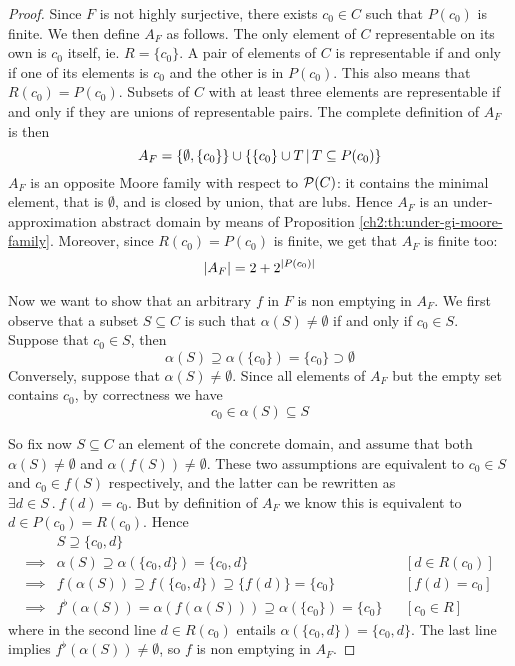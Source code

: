 \begin{proof}
	Since $F$ is not highly surjective, there exists $c_0 \in C$ such that $P(c_0)$ is finite. We then define $A_F$ as follows.
	The only element of $C$ representable on its own is $c_0$ itself, ie. $R = \{ c_0 \}$.
	A pair of elements of $C$ is representable if and only if one of its elements is $c_0$ and the other is in $P(c_0)$. This also means that $R(c_0) = P(c_0)$.
	Subsets of $C$ with at least three elements are representable if and only if they are unions of representable pairs.
	The complete definition of $A_F$ is then
	\[
	A_F = \{ \emptyset, \{ c_0 \} \} \cup \{ \{ c_0 \} \cup T \,\vert\, T \subseteq P(c_0) \}
	\]
	$A_F$ is an opposite Moore family with respect to $\mathcal{P}(C)$: it contains the minimal element, that is $\emptyset$, and is closed by union, that are lubs. Hence $A_F$ is an under-approximation abstract domain by means of Proposition \ref{ch2:th:under-gi-moore-family}.
	Moreover, since $R(c_0) = P(c_0)$ is finite, we get that $A_F$ is finite too:
	\[
	\lvert A_F\rvert = 2 + 2^{\lvert P(c_0)\rvert}
	\]

	Now we want to show that an arbitrary $f$ in $F$ is non emptying in $A_F$.
	We first observe that a subset $S \subseteq C$ is such that $\alpha(S) \neq \emptyset$ if and only if $c_0 \in S$. Suppose that $c_0 \in S$, then
	\[
	\alpha(S) \supseteq \alpha(\{ c_0 \}) = \{ c_0 \} \supset \emptyset
	\]
	Conversely, suppose that $\alpha(S) \neq \emptyset$. Since all elements of $A_F$ but the empty set contains $c_0$, by correctness we have
	\[
	c_0 \in \alpha(S) \subseteq S
	\]

	So fix now $S \subseteq C$ an element of the concrete domain, and assume that both $\alpha(S) \neq \emptyset$ and $\alpha(f(S)) \neq \emptyset$.
	These two assumptions are equivalent to $c_0 \in S$ and $c_0 \in f(S)$ respectively, and the latter can be rewritten as $\exists d \in S\ .\ f(d) = c_0$. But by definition of $A_F$ we know this is equivalent to $d \in P(c_0) = R(c_0)$.
	Hence
	\begin{align*}
		&S \supseteq \{ c_0, d \} && \\
		\implies& \alpha(S) \supseteq \alpha(\{ c_0, d \}) = \{ c_0, d \} && [d \in R(c_0)] \\
		\implies& f(\alpha(S)) \supseteq f(\{ c_0, d \}) \supseteq \{ f(d) \} = \{ c_0 \} && [f(d) = c_0] \\
		\implies& f^{\flat}(\alpha(S)) = \alpha(f(\alpha(S))) \supseteq \alpha(\{ c_0 \}) = \{ c_0 \} && [c_0 \in R]
	\end{align*}
	where in the second line $d \in R(c_0)$ entails $\alpha(\{ c_0, d \}) = \{ c_0, d \}$.
	The last line implies $f^{\flat}(\alpha(S)) \neq \emptyset$, so $f$ is non emptying in $A_F$.
\end{proof}

